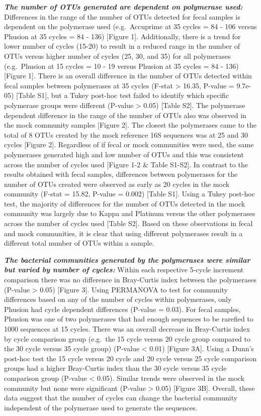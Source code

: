 \documentclass[11pt,]{article}
\begin{document}
\textbf{\emph{The number of OTUs generated are dependent on polymerase
used:}} Differences in the range of the number of OTUs detected for
fecal samples is dependent on the polymerase used (e.g.~Accuprime at 35
cycles = 84 - 106 versus Phusion at 35 cycles = 84 - 136) {[}Figure
1{]}. Additionally, there is a trend for lower number of cycles (15-20)
to result in a reduced range in the number of OTUs versus higher number
of cycles (25, 30, and 35) for all polymerases (e.g.~Phusion at 15
cycles = 10 - 19 versus Phusion at 35 cycles = 84 - 136) {[}Figure 1{]}.
There is an overall difference in the number of OTUs detected within
fecal samples between polymerases at 35 cycles (F-stat \textgreater{}
16.35, P-value = 9.7e-05) {[}Table S1{]}, but a Tukey post-hoc test
failed to identify which specific polymerase groups were different
(P-value \textgreater{} 0.05) {[}Table S2{]}. The polymerase dependent
difference in the range of the number of OTUs also was observed in the
mock community samples {[}Figure 2{]}. The closest the polymerases came
to the total of 8 OTUs created by the mock reference 16S sequences was
at 25 and 30 cycles {[}Figure 2{]}. Regardless of if fecal or mock
communities were used, the same polymerases generated high and low
number of OTUs and this was consistent across the number of cycles used
{[}Figure 1-2 \& Table S1-S2{]}. In contrast to the results obtained
with fecal samples, differences between polymerases for the number of
OTUs created were observed as early as 20 cycles in the mock community
(F-stat = 15.82, P-value = 0.002) {[}Table S1{]}. Using a Tukey post-hoc
test, the majority of differences for the number of OTUs detected in the
mock community was largely due to Kappa and Platinum versus the other
polymerases across the number of cycles used {[}Table S2{]}. Based on
these observations in fecal and mock communities, it is clear that using
different polymerases result in a different total number of OTUs within
a sample.

\textbf{\emph{The bacterial communities generated by the polymerases
were similar but varied by number of cycles:}} Within each respective
5-cycle increment comparison there was no difference in Bray-Curtis
index between the polymerases (P-value \textgreater{} 0.05) {[}Figure
3{]}. Using PERMANOVA to test for community differences based on any of
the number of cycles within polymerases, only Phusion had cycle
dependent differences (P-value = 0.03). For fecal samples, Phusion was
one of two polymerases that had enough sequences to be rarefied to 1000
sequences at 15 cycles. There was an overall decrease in Bray-Curtis
index by cycle comparison group (e.g.~the 15 cycle versus 20 cycle group
compared to the 30 cycle versus 35 cycle group) (P-value \textless{}
0.01) {[}Figure 3A{]}. Using a Dunn's post-hoc test the 15 cycle versus
20 cycle and 20 cycle versus 25 cycle comparison groups had a higher
Bray-Curtis index than the 30 cycle versus 35 cycle comparison group
(P-value \textless{} 0.05). Similar trends were observed in the mock
community but none were significant (P-value \textgreater{} 0.05)
{[}Figure 3B{]}. Overall, these data suggest that the number of cycles
can change the bacterial community independent of the polymerase used to
generate the sequences.
\end{document}
